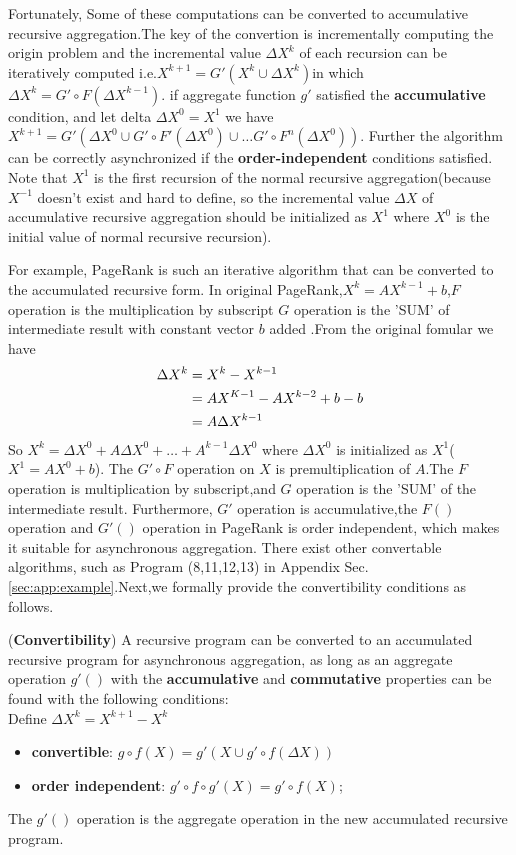 Fortunately, Some of these computations can be converted to accumulative recursive aggregation.The key of the convertion is incrementally computing the origin problem and the incremental value $\Delta X^k$ of each recursion can be iteratively computed i.e.$X^{k+1}=G'(X^{k}\cup \Delta X^{k})$in which $\Delta X^{k} =G' \circ F(\Delta X^{k-1})$.
if aggregate function $g'$ satisfied the \textbf{accumulative} condition,
and let delta $\Delta X^0=X^1$ we have $X^{k+1}=G'(\Delta X^0 \cup G'\circ F'(\Delta X^0)\cup \ldots G' \circ F^n(\Delta X^0))$. Further the algorithm can be correctly asynchronized if the \textbf{order-independent} conditions satisfied. Note that $X^1$ is the first recursion of the normal recursive aggregation(because $X^{-1}$ doesn't exist and hard to define, so the incremental value $\Delta X$ of accumulative recursive aggregation should be initialized as $X^1$ where $X^0$ is the initial value of normal recursive recursion). 

For example, PageRank is such an iterative algorithm that can be converted to the accumulated recursive form. %
In original PageRank,$X^k=AX^{k-1}+b$,$F$ operation is the multiplication by subscript $G$ operation is the 'SUM' of intermediate result with constant vector $b$ added .From the original fomular we have
\begin{equation}
\begin{aligned}
\Delta X^k&=X^k-X^{k-1} \notag\\&=AX^{K-1}-AX^{k-2}+b-b\notag\\&=A\Delta X^{k-1}\notag
\end{aligned}
\end{equation}
So $X^k=\Delta X^0+A\Delta X^0+\ldots+A^{k-1}\Delta X^0$
where $\Delta X^0$ is initialized as $X^1$($X^1=AX^0+b$). The $G'\circ F$ operation on $X$ is premultiplication of $A$.The $F$ operation is multiplication by subscript,and $G$ operation is the 'SUM' of the intermediate result. 
Furthermore, $G'$ operation is accumulative,the $F()$ operation and $G'()$ operation in PageRank is order independent, which makes it suitable for asynchronous aggregation. There exist other convertable algorithms, such as Program (8,11,12,13) in Appendix Sec. \ref{sec:app:example}.Next,we formally provide the convertibility conditions as follows.

\begin{theorem}
	\label{th:convert}
	(\textbf{Convertibility}) A recursive program can be converted to an accumulated recursive program for asynchronous aggregation, as long as an aggregate operation $g'()$ with the \textbf{accumulative} and \textbf{commutative} properties can be found with the following conditions:\\
	Define $\Delta X^k=X^{k+1}-X^k$
	\begin{itemize}
		\item \textbf{convertible}: $g\circ f(X)=g'(X\cup g'\circ f(\Delta X))$
\item \textbf{order independent}: $g'\circ f\circ g'(X)=g'\circ f(X)$;
	\end{itemize}
	 The $g'()$ operation is the aggregate operation in the new accumulated recursive program.
\end{theorem}

